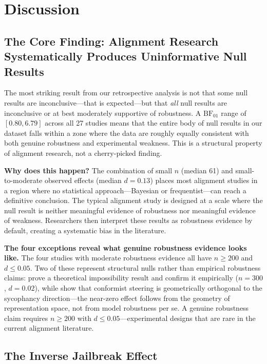 \section{Discussion}
\label{sec:discussion}

\subsection{The Core Finding: Alignment Research Systematically Produces Uninformative Null Results}

The most striking result from our retrospective analysis is not that some null results
are inconclusive---that is expected---but that \emph{all} null results are inconclusive
or at best moderately supportive of robustness. A $\mathrm{BF}_{01}$ range of
$[0.80, 6.79]$ across all 27 studies means that the entire body of null results in our
dataset falls within a zone where the data are roughly equally consistent with both
genuine robustness and experimental weakness. This is a structural property of alignment
research, not a cherry-picked finding.

{\bf Why does this happen?}
The combination of small $n$ (median 61) and small-to-moderate observed effects
(median $d = 0.13$) places most alignment studies in a region where no statistical
approach---Bayesian or frequentist---can reach a definitive conclusion. The typical
alignment study is designed at a scale where the null result is neither meaningful
evidence of robustness nor meaningful evidence of weakness. Researchers then
interpret these results as robustness evidence by default, creating a systematic
bias in the literature.

{\bf The four exceptions reveal what genuine robustness evidence looks like.}
The four studies with moderate robustness evidence all have $n \geq 200$ and $d \leq 0.05$.
Two of these represent structural nulls rather than empirical robustness claims:
\citet{santos2026limits} prove a theoretical impossibility result and confirm it
empirically ($n=300$, $d=0.02$), while \citet{kelkar2026persona} show that conformist
steering is geometrically orthogonal to the sycophancy direction---the near-zero effect
follows from the geometry of representation space, not from model robustness per se.
A genuine robustness claim requires $n \geq 200$ with $d \leq 0.05$---experimental
designs that are rare in the current alignment literature.

\subsection{The Inverse Jailbreak Effect}


